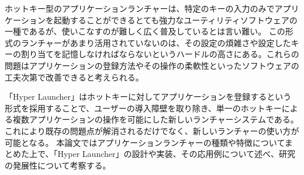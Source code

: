 \begin{jabstract}

ホットキー型のアプリケーションランチャーは、特定のキーの入力のみでアプリケーションを起動することができるとても強力なユーティリティソフトウェアの一種であるが、使いこなすのが難しく広く普及しているとは言い難い。
この形式のランチャーがあまり活用されていないのは、その設定の煩雑さや設定したキーの割り当てを記憶しなければならないというハードルの高さにある。これらの問題はアプリケーションの登録方法やその操作の柔軟性といったソフトウェアの工夫次第で改善できると考えられる。

「Hyper Launcher」はホットキーに対してアプリケーションを登録するという形式を採用することで、ユーザーの導入障壁を取り除き、単一のホットキーによる複数アプリケーションの操作を可能にした新しいランチャーシステムである。これにより既存の問題点が解消されるだけでなく、新しいランチャーの使い方が可能となる。
本論文ではアプリケーションランチャーの種類や特徴についてまとめた上で、「Hyper Launcher」の設計や実装、その応用例について述べ、研究の発展性について考察する。
\end{jabstract}

